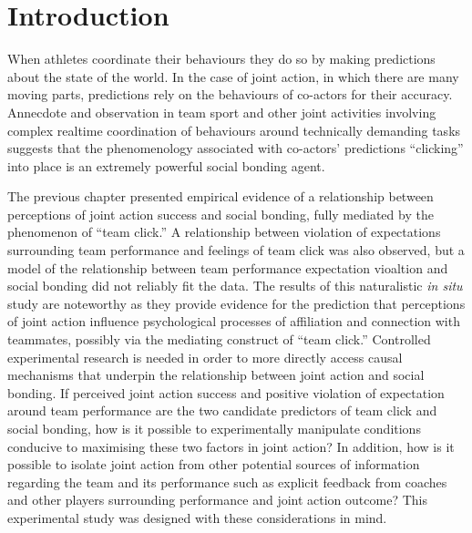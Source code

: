 \documentclass[english]{article}\usepackage[]{graphicx}\usepackage[]{color}
\begin{document}
%



















\section{Introduction}
When athletes coordinate their behaviours they do so by making predictions about the state of the world.  In the case of joint action, in which there are many moving parts, predictions rely on the behaviours of co-actors for their accuracy. Annecdote and observation in team sport and other joint activities involving complex realtime coordination of behaviours around technically demanding tasks suggests that the phenomenology associated with co-actors' predictions ``clicking'' into place is an extremely powerful social bonding agent.

The previous chapter presented empirical evidence of a relationship between perceptions of joint action success and social bonding, fully mediated by the phenomenon of ``team click.'' A relationship between violation of expectations surrounding team performance and feelings of team click was also observed, but a model of the relationship between team performance expectation vioaltion and social bonding did not reliably fit the data.  The results of this naturalistic \textit{in situ} study are noteworthy as they provide evidence for the prediction that perceptions of joint action influence psychological processes of affiliation and connection with teammates, possibly via the mediating construct of ``team click.''  Controlled experimental research is needed in order to more directly access causal mechanisms that underpin the relationship between joint action and social bonding.  If perceived joint action success and positive violation of expectation around team performance are the two candidate predictors of team click and social bonding, how is it possible to experimentally manipulate conditions conducive to maximising these two factors in joint action? In addition, how is it possible to isolate joint action from other potential sources of information regarding the team and its performance such as explicit feedback from coaches and other players surrounding performance and joint action outcome? This experimental study was designed with these considerations in mind.
\end{document}
